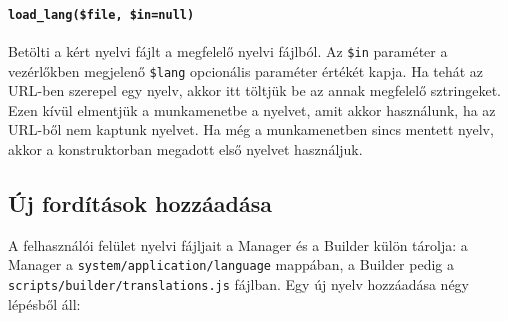\documentclass[12pt,a4paper,twoside]{article}
\begin{document}
\paragraph{\texttt{load\_lang(\$file, \$in=null)}}
Betölti a kért nyelvi fájlt a megfelelő nyelvi fájlból. Az \texttt{\$in}
paraméter a vezérlőkben megjelenő \texttt{\$lang} opcionális paraméter értékét
kapja. Ha tehát az URL-ben szerepel egy nyelv, akkor itt töltjük be az annak
megfelelő sztringeket. Ezen kívül elmentjük a munkamenetbe a nyelvet, amit akkor
használunk, ha az URL-ből nem kaptunk nyelvet. Ha még a munkamenetben sincs
mentett nyelv, akkor a konstruktorban megadott első nyelvet használjuk.


\subsection{Új fordítások hozzáadása}
\label{sec:manager-i18n}

A felhasználói felület nyelvi fájljait a Manager és a Builder külön tárolja: a
Manager a \texttt{system/application/language} mappában, a Builder pedig a
\texttt{scripts/builder/translations.js} fájlban. Egy új nyelv hozzáadása négy
lépésből áll:
\end{document}
